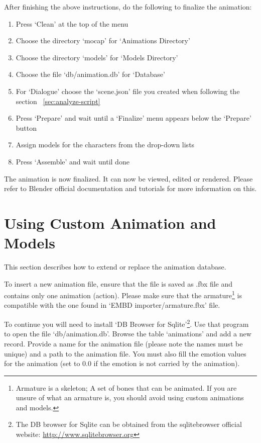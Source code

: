 \noindent After finishing the above instructions, do the following to finalize the animation:
\begin{enumerate}
	\item Press `Clean' at the top of the menu
	\item Choose the directory `mocap' for `Animations Directory'
	\item Choose the directory `models' for `Models Directory'
	\item Choose the file `db/animation.db' for `Database'
	\item For `Dialogue' choose the `scene.json' file you created when following the section ~\ref{sec:analyze-script}
	\item Press `Prepare' and wait until a `Finalize' menu appears below the `Prepare' button
	\item Assign models for the characters from the drop-down lists
	\item Press `Assemble' and wait until done
\end{enumerate}

\noindent The animation is now finalized. It can now be viewed, edited or rendered. Please refer to Blender official documentation and tutorials for more information on this.

\section{Using Custom Animation and Models}
This section describes how to extend or replace the animation database.

To insert a new animation file, ensure that the file is saved as .fbx file and contains only one animation (action). Please make sure that the armature\footnote{Armature is a skeleton; A set of bones that can be animated. If you are unsure of what an armature is, you should avoid using custom animations and models.} is compatible with the one found in `EMBD importer/armature.fbx' file.

To continue you will need to install `DB Browser for Sqlite'\footnote{The DB browser for Sqlite can be obtained from the sqlitebrowser official website:  \url{http://www.sqlitebrowser.org}}. Use that program to open the file `db/animation.db'. Browse the table `animations' and add a new record. Provide a name for the animation file (please note the names must be unique) and a path to the animation file. You must also fill the emotion values for the animation (set to 0.0 if the emotion is not carried by the animation).

